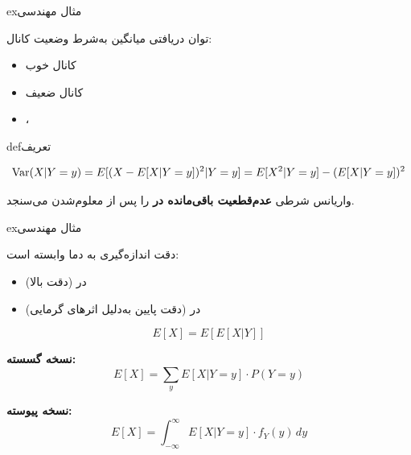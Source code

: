 \begin{PSbox}[unbreakable]{ex}{مثال مهندسی}

توان دریافتی میانگین به‌شرط وضعیت کانال:

\begin{itemize}
\tightlist
\item
  کانال خوب 
\item
  کانال ضعیف 
\item
  ، 
\end{itemize}

\end{PSbox}


\begin{PSbox}[unbreakable]{def}{تعریف}

\[\text{Var}(X|Y=y) = E[(X - E[X|Y=y])^2 | Y=y] = E[X^2|Y=y] - (E[X|Y=y])^2\]

\end{PSbox}


واریانس شرطی \textbf{عدم‌قطعیت باقی‌مانده در } را پس از معلوم‌شدن  می‌سنجد.

\begin{PSbox}[unbreakable]{ex}{مثال مهندسی}

دقت اندازه‌گیری به دما وابسته است:

\begin{itemize}
\tightlist
\item
  در  (دقت بالا)
\item
  در  (دقت پایین به‌دلیل اثرهای گرمایی)
\end{itemize}

\end{PSbox}



\[E[X] = E[E[X|Y]]\]

\textbf{نسخه گسسته:}\PSbr{}\[E[X] = \sum_y E[X|Y=y] \cdot P(Y=y)\]

\textbf{نسخه پیوسته:}\PSbr{}\[E[X] = \int_{-\infty}^{\infty} E[X|Y=y] \cdot f_Y(y) \, dy\]


